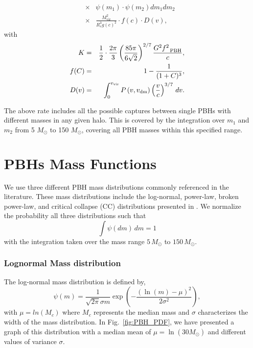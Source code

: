 \documentclass[aps, prd, reprint, nofootinbib]{revtex4-2}
\begin{document}
\begin{appendix}
\begin{eqnarray}
&\times&  \psi(m_1) \cdot \psi(m_2)  dm_1   dm_2  \nonumber \\
&\times& \frac{M_{\textrm{vir}}^2}{R_s^3 g(c)^2} \cdot f(c)\cdot D(v),
\end{eqnarray}
with 
\begin{eqnarray}
K &=& \frac{1}{2}\cdot \frac{2\pi}{3}\left(\frac{85 \pi}{6 \sqrt{2}}\right)^{2 / 7} \frac{G^2 f_{\textrm{ \, PBH}}^2  }{c}, \nonumber \\
f(C) &=& 1 - \frac{1}{(1+C)^3}, \\
D(v) &=& \int_0^{v_{\textrm{vir}}} P\left(v, v_{\textrm{dm}}\right)\left(\frac{v}{c}\right)^{3 / 7} \, dv. \nonumber
\end{eqnarray}

The above rate includes  all the possible captures between single PBHs with different masses in any given halo. This is covered by the integration over $m_1$ and $m_2$  from 5 $M_\odot$ to 150 $M_\odot$, covering all PBH masses within this specified range.


\section{PBHs Mass Functions}
\label{PBH_PDFs}
We use three different PBH mass distributions commonly referenced in the literature. These mass distributions include the log-normal, power-law, broken power-law, and critical collapse (CC) distributions presented in \cite{Chen:2024dxh}. We normalize the probability all three distributions such that 
\begin{equation}
\int \psi(dm) \, dm = 1
\end{equation}with the integration taken over the mass range \(5 \, M_\odot\) to \(150 \, M_\odot\). 

\subsubsection{Lognormal Mass distribution} 
The log-normal mass distribution is defined by,
\begin{equation}
\psi(m)=\frac{1}{\sqrt{2 \pi} \sigma m} \exp \left(-\frac{\left(\ln(m) -\mu\right)^2}{2 \sigma^2}\right), 
\end{equation}
with $\mu =ln(M_c)$  where  $M_c$ represents the median mass and $\sigma$ characterizes the width of the mass distribution.
In Fig.~\ref{fig:PBH_PDF}, we have presented a graph of this distribution with a median mean of $\mu=\ln(30 M_\odot)$ and different values of variance $\sigma$.



\end{appendix}
\end{document}
